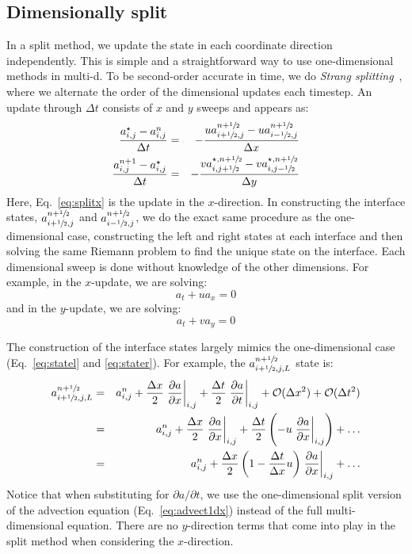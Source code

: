 \subsection{Dimensionally split}
\label{adv:sec:dimensionalsplit}

In a split method, we update the state in each coordinate direction
independently.  This is simple and a straightforward way to use
one-dimensional methods in multi-d.  To be second-order accurate in
time, we do {\em Strang splitting}~\cite{strang}, where we alternate
the order of the dimensional updates each timestep.  An update through
$\Delta t$ consists of $x$ and $y$ sweeps and appears as:
\begin{eqnarray}
 \frac{a_{i,j}^\star - a_{i,j}^n}{\Delta t} &=&
  - \frac{ u a_{i+{\sfrac{1}{2}},j}^{n+{\sfrac{1}{2}}} - u a_{i-{\sfrac{1}{2}},j}^{n+{\sfrac{1}{2}}} }{\Delta x} \label{eq:splitx}\\
 \frac{a_{i,j}^{n+1} - a_{i,j}^\star}{\Delta t} &=&
  - \frac{ v a_{i,j+{\sfrac{1}{2}}}^{\star,n+{\sfrac{1}{2}}} - v a_{i,j-{\sfrac{1}{2}}}^{\star,n+{\sfrac{1}{2}}} }{\Delta y} \label{eq:splity}
\end{eqnarray}
Here, Eq.~\ref{eq:splitx} is the update in the $x$-direction.  In
constructing the interface states, $a_{i+{\sfrac{1}{2}},j}^{n+{\sfrac{1}{2}}}$ and
$a_{i-{\sfrac{1}{2}},j}^{n+{\sfrac{1}{2}}}$, we do the exact same procedure as the
one-dimensional case, constructing the left and right states at each
interface and then solving the same Riemann problem to find the unique
state on the interface.  Each dimensional sweep is done without
knowledge of the other dimensions.  For example, in the $x$-update, we
are solving:
\begin{equation}
a_t + u a_x = 0
\label{eq:advect1dx}
\end{equation}
and in the $y$-update, we are solving:
\begin{equation}
a_t + v a_y = 0
\end{equation}

The construction of the interface states largely mimics the one-dimensional
case (Eq.~\ref{eq:statel} and \ref{eq:stater}).  For example, the
$a_{i+{\sfrac{1}{2}},j,L}^{n+{\sfrac{1}{2}}}$ state is:
\begin{eqnarray}
a_{i+{\sfrac{1}{2}},j,L}^{n+{\sfrac{1}{2}}} &=& a_{i,j}^n +
  \frac{\Delta x}{2} \left .\frac{\partial a}{\partial x} \right |_{i,j} +
  \frac{\Delta t}{2} \left .\frac{\partial a}{\partial t} \right |_{i,j} +
  \mathcal{O}(\Delta x^2) + \mathcal{O}(\Delta t^2) \nonumber \\
 &=& a_{i,j}^n +
   \frac{\Delta x}{2} \left .\frac{\partial a}{\partial x} \right |_{i,j} +
   \frac{\Delta t}{2} \left (
   - u \left .\frac{\partial a}{\partial x} \right |_{i,j} \right
   ) + \ldots \nonumber \\
    &=& a_{i,j}^n +
   \frac{\Delta x}{2} \left ( 1 - \frac{\Delta t}{\Delta x} u \right )
   \left .\frac{\partial a}{\partial x} \right |_{i,j} +
   \ldots \label{eq:statels}
\end{eqnarray}
Notice that when substituting for $\partial a / \partial t$, we use
the one-dimensional split version of the advection equation
(Eq.~\ref{eq:advect1dx}) instead of the full multi-dimensional
equation.  There are no $y$-direction terms that come into play in the
split method when considering the $x$-direction.

